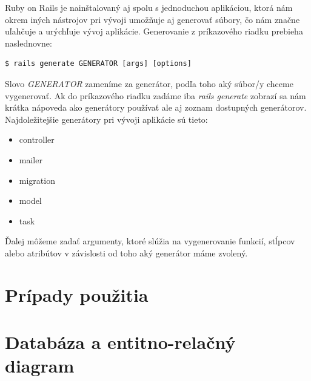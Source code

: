 Ruby on Rails je nainštalovaný aj spolu s jednoduchou aplikáciou, ktorá nám okrem iných nástrojov pri vývoji umožňuje aj generovať súbory, čo nám značne uľahčuje a urýchľuje vývoj aplikácie. Generovanie z príkazového riadku prebieha naslednovne:

\begin{verbatim}
$ rails generate GENERATOR [args] [options]
\end{verbatim}

Slovo \emph{GENERATOR} zameníme za generátor, podľa toho aký súbor/y chceme vygenerovať. Ak do príkazového riadku zadáme iba \emph{rails generate} zobrazí sa nám krátka nápoveda ako generátory používať ale aj zoznam dostupných generátorov. Najdoležitejšie generátory pri vývoji aplikácie sú tieto:

\begin{itemize}
  \item controller
  \item mailer
  \item migration
  \item model
  \item task
\end{itemize}

Ďalej môžeme zadať argumenty, ktoré slúžia na vygenerovanie funkcií, stĺpcov alebo atribútov v závislosti od toho aký generátor máme zvolený.


\clearpage
\section{Prípady použitia}

\clearpage
\section{Databáza a entitno-relačný diagram}

